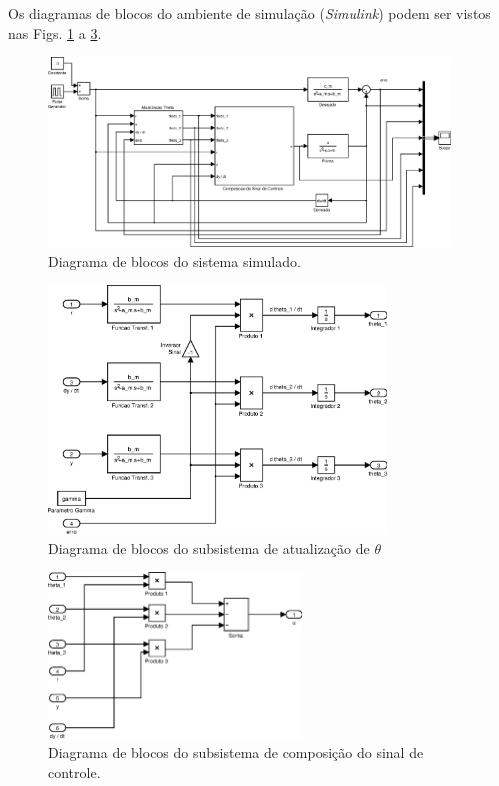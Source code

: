 Os diagramas de blocos do ambiente de simulação ({\it Simulink}) podem ser
vistos nas Figs. \ref{fig:q3_sistema} a \ref{fig:q3_sinal_cont}.

\begin{figure}[htb]
    \centering
    \includegraphics[width=0.95\textwidth]{imgs/questao3/sistema}
    \caption{Diagrama de blocos do sistema simulado.}
    \label{fig:q3_sistema}
\end{figure}

\begin{figure}[H]
    \centering
    \includegraphics[width=0.8\textwidth]{imgs/questao3/theta}
    \caption{Diagrama de blocos do subsistema de atualização de $\theta$}
    \label{fig:q3_theta}
\end{figure}

\begin{figure}[H]
    \centering
    \includegraphics[width=0.6\textwidth]{imgs/questao3/sinal_controle}
    \caption{Diagrama de blocos do subsistema de composição do sinal de
             controle.}
    \label{fig:q3_sinal_cont}
\end{figure}

